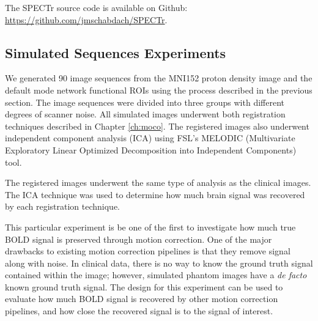 The SPECTr source code is available on Github: \url{https://github.com/jmschabdach/SPECTr}.



\subsection{Simulated Sequences Experiments}

We generated 90 image sequences from the MNI152 proton density image and the default mode network functional ROIs using the process described in the previous section. The image sequences were divided into three groups with different degrees of scanner noise. All simulated images underwent both registration techniques described in Chapter \ref{ch:moco}. The registered images also underwent independent component analysis (ICA) using FSL's MELODIC (Multivariate Exploratory Linear Optimized Decomposition into Independent Components) tool. %

The registered images underwent the same type of analysis as the clinical images. The ICA technique was used to determine how much brain signal was recovered by each registration technique.

This particular experiment is be one of the first to investigate how much true BOLD signal is preserved through motion correction. One of the major drawbacks to existing motion correction pipelines is that they remove signal along with noise. In clinical data, there is no way to know the ground truth signal contained within the image; however, simulated phantom images have a \textit{de facto} known ground truth signal. The design for this experiment can be used to evaluate how much BOLD signal is recovered by other motion correction pipelines, and how close the recovered signal is to the signal of interest.


